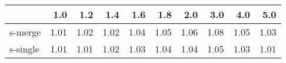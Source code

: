 \begin{tabular}{lrrrrrrrrr}
\toprule
{} &  1.0 &  1.2 &  1.4 &  1.6 &  1.8 &  2.0 &  3.0 &  4.0 &  5.0 \\
\midrule
s-merge  & 1.01 & 1.02 & 1.02 & 1.04 & 1.05 & 1.06 & 1.08 & 1.05 & 1.03 \\
s-single & 1.01 & 1.01 & 1.02 & 1.03 & 1.04 & 1.04 & 1.05 & 1.03 & 1.01 \\
\bottomrule
\end{tabular}
